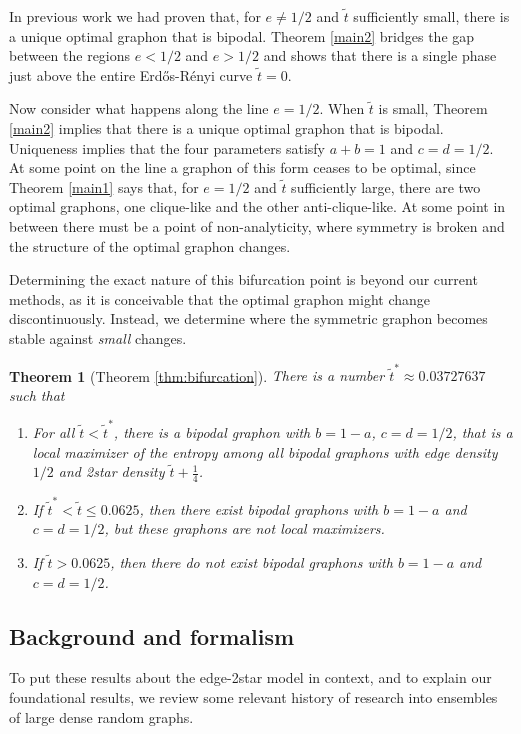 \documentclass[12pt]{amsart}
\newcommand{\ER}{Erd\H{o}s-R\'enyi}
\newcommand{\1}{\mathbf{1}}
\newtheorem{theorem}[lemma]{Theorem}
\begin{document}
In previous work \cite{KRRS1} we had proven that, for $e \ne 1/2$ and $\tilde t$
sufficiently small, there is a unique optimal graphon that is bipodal. Theorem
\ref{main2} bridges the gap between the regions $e<1/2$ and $e>1/2$ and shows that 
there is a single phase just above the entire \ER{} curve $\tilde t = 0$. 

Now consider what happens along the line $e=1/2$. When $\tilde t$ is small, Theorem
\ref{main2} implies that there is a unique optimal graphon that is bipodal. 
Uniqueness implies that the four parameters satisfy $a+b=1$ and $c=d=1/2$. At some
point on the line a graphon of this form ceases to be optimal, since 
Theorem \ref{main1} says that,
for $e = 1/2$ and $\tilde t$ sufficiently large, there are two optimal graphons,
one clique-like and the other anti-clique-like. At some point in between there must 
be a point of non-analyticity, where symmetry is broken and 
the structure of the optimal graphon changes.

Determining the exact nature of this bifurcation point is beyond our current methods, as
it is conceivable that the optimal graphon might change discontinuously. Instead, we
determine where the symmetric graphon becomes stable 
against {\em small} changes.

\begin{theorem}[Theorem \ref{thm:bifurcation}] \label{main3} 
There is a number $\tilde t^* \approx 0.03727637$ such that
\begin{enumerate} 
\item For all $\tilde t < \tilde t^*$, there is a bipodal graphon with $b=1-a$, $c=d=1/2$, 
that is a local maximizer of the entropy among all bipodal graphons with edge density 
$1/2$ and 2star density $\tilde t + \frac14$.
\item If $\tilde t^* < \tilde t \le 0.0625$, then there exist bipodal graphons with $b=1-a$ and
$c=d=1/2$, but these graphons are not local maximizers. 
\item If $\tilde t > 0.0625$, then there do not exist bipodal graphons with $b=1-a$ and $c=d=1/2$. 
\end{enumerate}
\end{theorem}


\subsection{Background and formalism} 
To put these results about the edge-2star model in context, 
and to explain our foundational results, we review 
some relevant history of research into
ensembles of large dense random graphs. 
\end{document}
